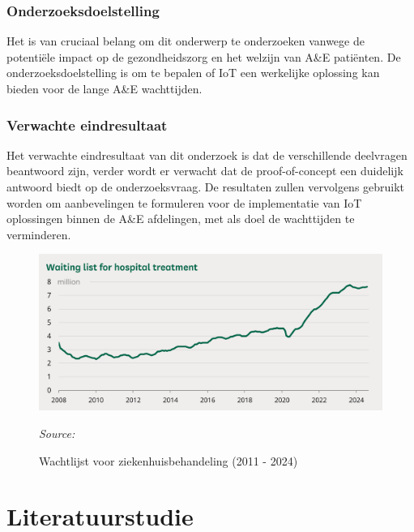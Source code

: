 \subsubsection*{Onderzoeksdoelstelling}
Het is van cruciaal belang om dit onderwerp te onderzoeken vanwege de potentiële impact op de gezondheidszorg en het welzijn van A\&E patiënten. De onderzoeksdoelstelling is om te bepalen of IoT een werkelijke oplossing kan bieden voor de lange A\&E wachttijden.


\subsubsection*{Verwachte eindresultaat} 
Het verwachte eindresultaat van dit onderzoek is dat de verschillende deelvragen beantwoord zijn, verder wordt er verwacht dat de proof-of-concept een duidelijk antwoord biedt op de onderzoeksvraag. De resultaten zullen vervolgens gebruikt worden om aanbevelingen te formuleren voor de implementatie van IoT oplossingen binnen de A\&E afdelingen, met als doel de wachttijden te verminderen.


\begin{figure}[h]
    \centering
    \includegraphics[width=1\linewidth]{img/Figuur-0.png}
    \caption{Wachtlijst voor ziekenhuisbehandeling (2011 - 2024)}
    \label{fig:Figuur0}
    \textit{Source: \autocite{Stiebahl2024}}
\end{figure}


\section{Literatuurstudie}%
\label{sec:literatuurstudie}


